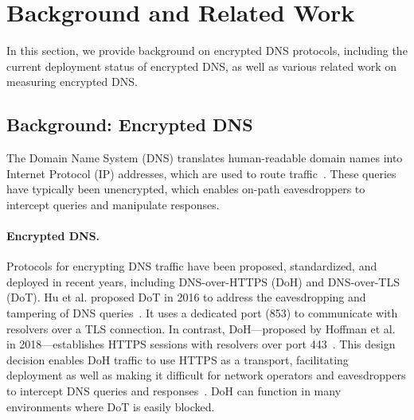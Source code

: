 \section{Background and Related Work}\label{sec:background}

In this section, we provide background on encrypted DNS protocols, including
the current deployment status of encrypted DNS, as well as various related
work on measuring encrypted DNS.

\subsection{Background: Encrypted DNS}

The Domain Name System (DNS) translates human-readable domain names into
Internet Protocol (IP) addresses, which are used to route
traffic~\cite{rfc1035}.  These queries have typically been unencrypted, which
enables on-path eavesdroppers to intercept queries and manipulate responses.


\paragraph{Encrypted DNS.}
Protocols for encrypting DNS traffic have been proposed, standardized, and
deployed in recent years, including DNS-over-HTTPS (DoH) and DNS-over-TLS
(DoT).  Hu et al. proposed DoT in 2016 to address the eavesdropping and
tampering of DNS queries~\cite{hu2016DoT}.  It uses a dedicated port (853)
to communicate with resolvers over a TLS connection.  In contrast,
DoH---proposed by Hoffman et al. in 2018---establishes HTTPS sessions with
resolvers over port 443~\cite{hoffman2018DoH}.  This design decision enables
DoH traffic to use HTTPS as a transport, facilitating deployment as well as
making it difficult for network operators and eavesdroppers to intercept DNS
queries and responses~\cite{boettger2019empirical}. DoH can function in many
environments where DoT is easily blocked.

